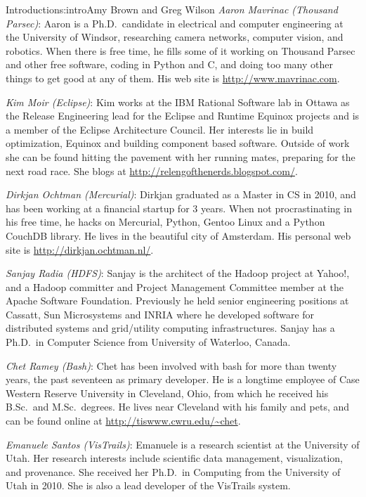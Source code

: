 \begin{aosachapter}{Introduction}{s:intro}{Amy Brown and Greg Wilson}
\emph{Aaron Mavrinac (Thousand Parsec)}: Aaron is a
Ph.D.\ candidate in electrical and computer engineering at the
University of Windsor, researching camera networks, computer
vision, and robotics. When there is free time, he fills some of it
working on Thousand Parsec and other free software, coding in
Python and C, and doing too many other things to get good at any
of them.  His web site is \url{http://www.mavrinac.com}.

\emph{Kim Moir (Eclipse)}: Kim works at the IBM Rational
Software lab in Ottawa as the Release Engineering lead for the
Eclipse and Runtime Equinox projects and is a member of the
Eclipse Architecture Council.  Her interests lie in build
optimization, Equinox and building component based software.
Outside of work she can be found hitting the pavement with her
running mates, preparing for the next road race.  She blogs at
\url{http://relengofthenerds.blogspot.com/}.

\emph{Dirkjan Ochtman (Mercurial)}: Dirkjan graduated as a
Master in CS in 2010, and has been working at a financial startup
for 3 years. When not procrastinating in his free time, he hacks
on Mercurial, Python, Gentoo Linux and a Python CouchDB
library. He lives in the beautiful city of Amsterdam.  His
personal web site is \url{http://dirkjan.ochtman.nl/}.

\emph{Sanjay Radia (HDFS)}: Sanjay is the architect of the Hadoop
project at Yahoo!, and a Hadoop committer and Project Management
Committee member at the Apache Software Foundation. Previously he held
senior engineering positions at Cassatt, Sun Microsystems and INRIA
where he developed software for distributed systems and grid/utility
computing infrastructures. Sanjay has a Ph.D.\ in Computer Science from
University of Waterloo, Canada.

\emph{Chet Ramey (Bash)}: Chet has been involved with bash
for more than twenty years, the past seventeen as primary
developer.  He is a longtime employee of Case Western Reserve
University in Cleveland, Ohio, from which he received his B.Sc.\  and
M.Sc.\ degrees.  He lives near Cleveland with his family and pets,
and can be found online at \url{http://tiswww.cwru.edu/~chet}.

\emph{Emanuele Santos (VisTrails)}: Emanuele is a research scientist
at the University of Utah. Her research interests include scientific
data management, visualization, and provenance. She received her
Ph.D.\ in Computing from the University of Utah in 2010. She is also a
lead developer of the VisTrails system.


\end{aosachapter}
